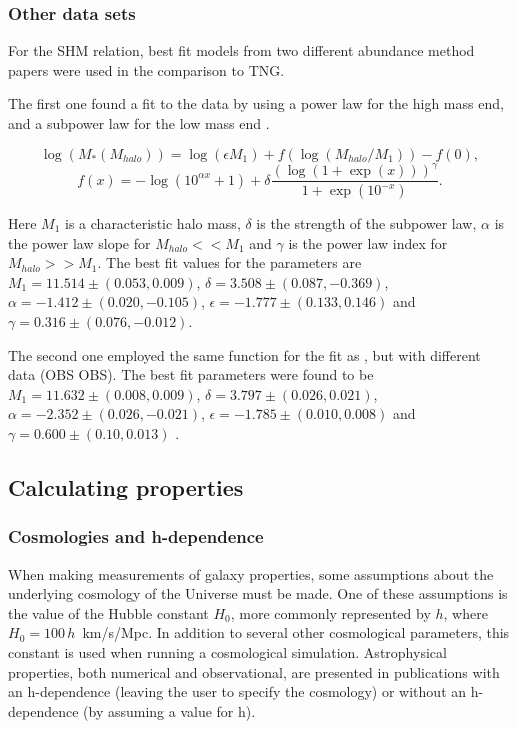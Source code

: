 \subsubsection{Other data sets}
For the SHM relation, best fit models from two different abundance method papers were used in the comparison to TNG.

The first one found a fit to the data by using a power law for the high mass end, and a subpower law for the low mass end \parencite{Behroozi2013}.

\begin{equation} \label{eq_behroozi}
    \log(M_*(M_{halo})) = \log(\epsilon M_1) + f(\log(M_{halo}/M_1)) -f(0),
\end{equation}
\begin{equation*}
    f(x) = -\log(10^{\alpha x}+1)+\delta \frac{(\log(1+\exp(x)))^\gamma}{1 +\exp(10^{-x})}.
\end{equation*}

Here $M_1$ is a characteristic halo mass, $\delta$ is the strength of the subpower law, $\alpha$ is the power law slope for $M_{halo} << M_1$ and $\gamma$ is the power law index for $M_{halo} >> M_1$. The best fit values for the parameters are $M_1 = 11.514\pm(0.053, 0.009)$, $\delta = 3.508 \pm (0.087, -0.369)$, $\alpha = -1.412 \pm (0.020, -0.105)$, $\epsilon = -1.777 \pm (0.133, 0.146)$ and $\gamma = 0.316 \pm (0.076, -0.012)$.

The second one employed the same function for the fit as \textcite{Behroozi2013}, but with different data (OBS OBS). The best fit parameters were found to be $M_1 = 11.632\pm(0.008, 0.009)$, $\delta = 3.797 \pm (0.026, 0.021)$, $\alpha = -2.352 \pm (0.026, -0.021)$, $\epsilon = -1.785 \pm (0.010, 0.008)$  and $\gamma = 0.600 \pm (0.10, 0.013)$ \parencite{Zanisi2019}.


\subsection{Calculating properties}

\subsubsection{Cosmologies and h-dependence} \label{cosmologies}
When making measurements of galaxy properties, some assumptions about the underlying cosmology of the Universe must be made. One of these assumptions is the value of the Hubble constant $H_0$, more commonly represented by $h$, where $H_0 = 100\,h\,$ km/s/Mpc. In addition to several other cosmological parameters, this constant is used when running a cosmological simulation. Astrophysical properties, both numerical and observational, are presented in publications with an h-dependence (leaving the user to specify the cosmology) or without an h-dependence (by assuming a value for h).

